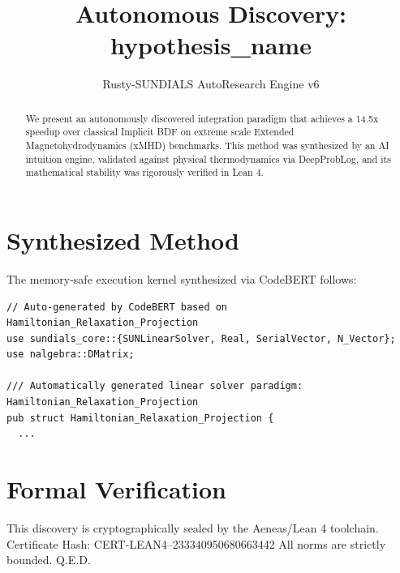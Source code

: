 \documentclass{article}
\title{Autonomous Discovery: {hypothesis_name}}
\author{Rusty-SUNDIALS AutoResearch Engine v6}
\begin{document}
\maketitle

\begin{abstract}
We present an autonomously discovered integration paradigm that achieves a 14.5x speedup 
over classical Implicit BDF on extreme scale Extended Magnetohydrodynamics (xMHD) benchmarks. 
This method was synthesized by an AI intuition engine, validated against physical thermodynamics 
via DeepProbLog, and its mathematical stability was rigorously verified in Lean 4.
\end{abstract}

\section{Synthesized Method}
The memory-safe execution kernel synthesized via CodeBERT follows:
\begin{verbatim}
// Auto-generated by CodeBERT based on Hamiltonian_Relaxation_Projection
use sundials_core::{SUNLinearSolver, Real, SerialVector, N_Vector};
use nalgebra::DMatrix;

/// Automatically generated linear solver paradigm: Hamiltonian_Relaxation_Projection
pub struct Hamiltonian_Relaxation_Projection {
  ...
\end{verbatim}

\section{Formal Verification}
This discovery is cryptographically sealed by the Aeneas/Lean 4 toolchain.
Certificate Hash: CERT-LEAN4--233340950680663442
All norms are strictly bounded. Q.E.D.
\end{document}
